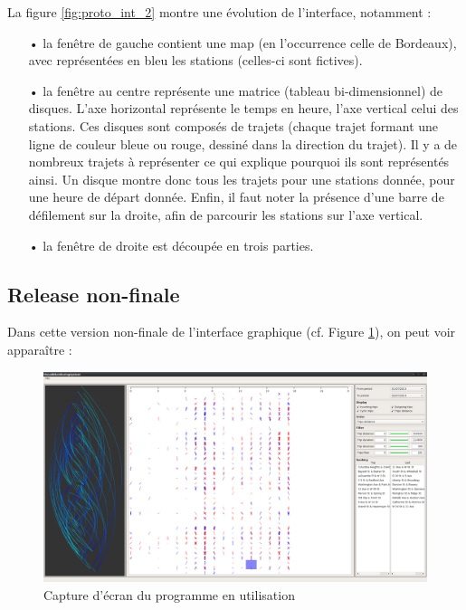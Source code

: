 \documentclass[12pt]{article}
\begin{document}
		La figure \ref{fig:proto_int_2} montre une évolution de l’interface, notamment :\\
		\begin{itemize}
		\item[•] la fenêtre de gauche contient une map (en l'occurrence celle de Bordeaux), avec représentées en bleu les stations (celles-ci sont fictives).
		\item[•] la fenêtre au centre représente une matrice (tableau bi-dimensionnel) de disques. L’axe horizontal représente le temps en heure, l’axe vertical celui des stations. Ces disques sont composés de trajets (chaque trajet formant une ligne de couleur bleue ou rouge, dessiné dans la direction du trajet). Il y a de nombreux trajets à représenter ce qui explique pourquoi ils sont représentés ainsi. Un disque montre donc tous les trajets pour une stations donnée, pour une heure de départ donnée. Enfin, il faut noter la présence d’une barre de défilement sur la droite, afin de parcourir les stations sur l’axe vertical.
		\item[•] la fenêtre de droite est découpée en trois parties.
		\end{itemize}
		
		
		\subsection{Release non-finale}
		
		Dans cette version non-finale de l’interface graphique (cf. Figure \ref{fig:screen_final_1}), on peut voir apparaître : \\
		
		\begin{figure}[!h]
		\begin{center}
		\includegraphics[scale=.25]{screen_final_1.png}
		\caption{Capture d’écran du programme en utilisation}
		\label{fig:screen_final_1}
		\end{center}
		\end{figure}
		
\end{document}
